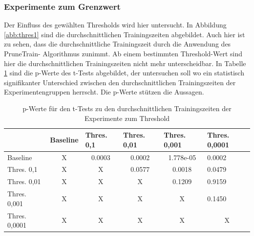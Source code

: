\subsubsection{Experimente zum Grenzwert}

Der Einfluss des gewählten Thresholds wird hier untersucht. In Abbildung \ref{abb:thres1} sind die durchschnittlichen Trainingszeiten abgebildet. Auch hier ist zu sehen, dass die durchschnittliche Trainingszeit durch die Anwendung des PruneTrain- Algorithmus zunimmt. Ab einem bestimmten Threshold-Wert sind hier die durchschnittlichen Trainingszeiten nicht mehr unterscheidbar. In Tabelle \ref{tab:thres1} sind die p-Werte des t-Tests abgebildet, der untersuchen soll wo ein statistisch signifikanter Unterschied zwischen den durchschnittlichen Trainingszeiten der Experimentengruppen herrscht. Die p-Werte stützen die Aussagen.

\begin{table}[]
\caption{p-Werte für den t-Tests zu den durchschnittlichen Trainingszeiten der Experimente zum Threshold}
\begin{tabular}{l|c|c|c|c|l|}
\cline{2-6}
                                       & \multicolumn{1}{l|}{Baseline} & \multicolumn{1}{l|}{Thres. 0,1} & \multicolumn{1}{l|}{Thres. 0,01} & \multicolumn{1}{l|}{Thres. 0,001} & Thres. 0,0001               \\ \hline
\multicolumn{1}{|l|}{Baseline}         & X                             & 0.0003                             & 0.0002                              & 1.778e-05                            & 0.0002                         \\ \hline
\multicolumn{1}{|l|}{Thres. 0,1}    & X                             & X                                  & \cellcolor[HTML]{FE0000}0.0577      & 0.0018                               & 0.0479                         \\ \hline
\multicolumn{1}{|l|}{Thres. 0,01}   & X                             & X                                  & X                                   & \cellcolor[HTML]{FE0000}0.1209       & \cellcolor[HTML]{FE0000}0.9159 \\ \hline
\multicolumn{1}{|l|}{Thres. 0,001}  & X                             & X                                  & X                                   & X                                    & \cellcolor[HTML]{FE0000}0.1450 \\ \hline
\multicolumn{1}{|l|}{Thres. 0,0001} & X                             & X                                  & X                                   & X                                    & \multicolumn{1}{c|}{X}         \\ \hline
\end{tabular}
\label{tab:thres1}
\end{table}


